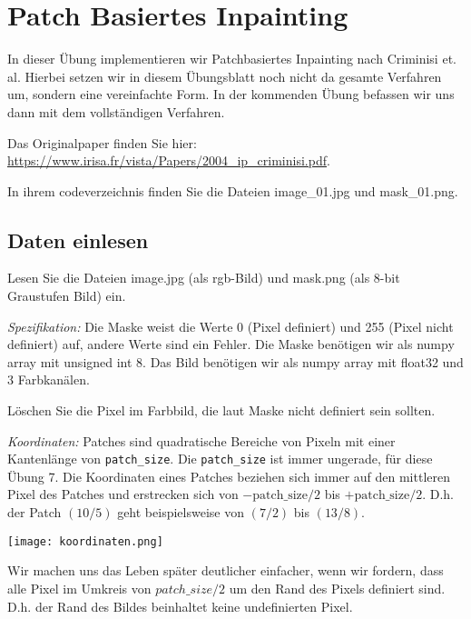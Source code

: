 \def\firstname{Tim}
\def\lastname{Dahmen}
\def\aufgabenblatt{4}




\thispagestyle{page1} 

\section{Patch Basiertes Inpainting}

In dieser Übung implementieren wir Patchbasiertes Inpainting nach Criminisi et. al. Hierbei
setzen wir in diesem Übungsblatt noch nicht da gesamte Verfahren um, sondern eine vereinfachte Form. In der kommenden Übung befassen wir uns dann mit dem vollständigen Verfahren. 

Das Originalpaper finden Sie hier: \href{https://www.irisa.fr/vista/Papers/2004\_ip\_criminisi.pdf}{https://www.irisa.fr/vista/Papers/2004\_ip\_criminisi.pdf}.

In ihrem codeverzeichnis finden Sie die  Dateien image\_01.jpg und mask\_01.png. 

\subsection{Daten einlesen}

Lesen Sie die Dateien image.jpg (als rgb-Bild) und mask.png (als 8-bit Graustufen Bild) ein.

\textit{Spezifikation:} Die Maske weist die Werte 0 (Pixel definiert) und
255 (Pixel nicht definiert) auf, andere Werte sind ein Fehler. Die Maske benötigen wir als numpy array mit unsigned int 8. Das Bild benötigen wir als numpy array mit float32 und 3 Farbkanälen.

Löschen Sie die Pixel im Farbbild, die laut Maske nicht definiert sein sollten.

\textit{Koordinaten:} Patches sind quadratische Bereiche von Pixeln mit einer Kantenlänge von  \texttt{patch\_size}. Die \texttt{patch\_size} ist immer ungerade, für diese Übung 7. Die Koordinaten eines Patches beziehen sich immer auf den mittleren Pixel des Patches und erstrecken sich von $- \text{patch\_size}/2$ bis $+\text{patch\_size}/2$. D.h. der Patch $(10/5)$ geht beispielsweise von $(7/2)$ bis $(13/8)$.

\texttt{[image: koordinaten.png]}

Wir machen uns das Leben später deutlicher einfacher, wenn wir fordern, dass alle Pixel im Umkreis von $patch\_size / 2$ um den Rand des Pixels definiert sind. D.h. der Rand des Bildes beinhaltet keine undefinierten Pixel. 

